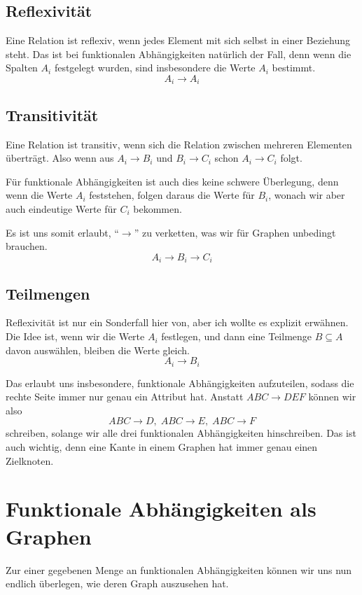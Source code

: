 \documentclass[a4paper, ngerman]{article}
\begin{document}
\subsection*{Reflexivität}
Eine Relation ist reflexiv,
wenn jedes Element mit sich selbst in einer Beziehung steht.
Das ist bei funktionalen Abhängigkeiten natürlich der Fall,
denn wenn die Spalten $A_i$ festgelegt wurden,
sind insbesondere die Werte $A_i$ bestimmt.
$$
    A_i \to A_i
$$

\subsection*{Transitivität}
Eine Relation ist transitiv,
wenn sich die Relation zwischen mehreren Elementen überträgt.
Also wenn aus $A_i \to B_i$ und $B_i \to C_i$ schon $A_i \to C_i$ folgt.

Für funktionale Abhängigkeiten ist auch dies keine schwere Überlegung,
denn wenn die Werte $A_i$ feststehen,
folgen daraus die Werte für $B_i$,
wonach wir aber auch eindeutige Werte für $C_i$ bekommen.

Es ist uns somit erlaubt,
\enquote{$\to$} zu verketten,
was wir für Graphen unbedingt brauchen.
$$
    A_i \to B_i \to C_i
$$

\subsection*{Teilmengen}
Reflexivität ist nur ein Sonderfall hier von,
aber ich wollte es explizit erwähnen.
Die Idee ist, wenn wir die Werte $A_i$ festlegen,
und dann eine Teilmenge $B \subseteq A$ davon auswählen,
bleiben die Werte gleich.
$$
    A_i \to B_i
$$

Das erlaubt uns insbesondere,
funktionale Abhängigkeiten aufzuteilen,
sodass die rechte Seite
immer nur genau ein Attribut hat.
Anstatt $ABC \to DEF$ können wir also
$$
    ABC \to D,\;
    ABC \to E,\;
    ABC \to F
$$
schreiben, solange wir alle drei
funktionalen Abhängigkeiten hinschreiben.
Das ist auch wichtig, denn eine Kante
in einem Graphen hat immer genau einen Zielknoten.

\section*{Funktionale Abhängigkeiten als Graphen}
Zur einer gegebenen Menge an funktionalen
Abhängigkeiten können
wir uns nun endlich überlegen,
wie deren Graph auszusehen hat.
\end{document}
